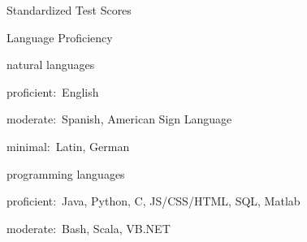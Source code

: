 \documentclass{resume}
\newcommand{\AP}[0]{\DepartmentTitle{AP Coursework}{}}
\begin{document}
\begin{rSection}{Standardized Test Scores}



  \end{rSection}





  \begin{rSection}{Language Proficiency}

  \begin{rSubSection}{\normalfont natural languages}{}{}{}
  \item proficient:~English
  \item moderate:~Spanish, American Sign Language
  \item minimal:~Latin, German
  \end{rSubSection}

  \begin{rSubSection}{\normalfont programming languages}{}{}{}
  \item proficient:~Java, Python, C, JS/CSS/HTML, SQL, Matlab
  \item moderate:~Bash, Scala, VB.NET
  \end{rSubSection}

  \end{rSection}
\end{document}
